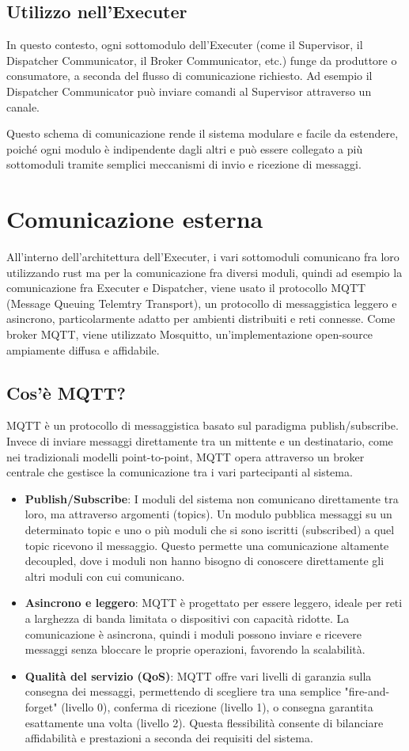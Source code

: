 \documentclass[target=bach,aauheader=,style=]{thud}
\begin{document}
\subsection{Utilizzo nell'Executer}
In questo contesto, ogni sottomodulo dell'Executer (come il Supervisor, il Dispatcher Communicator, il Broker Communicator, etc.) funge da produttore o consumatore, a seconda del flusso di comunicazione richiesto. Ad esempio il Dispatcher Communicator può inviare comandi al Supervisor attraverso un canale.

Questo schema di comunicazione rende il sistema modulare e facile da estendere, poiché ogni modulo è indipendente dagli altri e può essere collegato a più sottomoduli tramite semplici meccanismi di invio e ricezione di messaggi.

\section{Comunicazione esterna}
All'interno dell'architettura dell'Executer, i vari sottomoduli comunicano fra loro utilizzando rust ma per la comunicazione fra diversi moduli, quindi ad esempio la comunicazione fra Executer e Dispatcher, viene usato il protocollo MQTT (Message Queuing Telemtry Transport), un protocollo di messaggistica leggero e asincrono, particolarmente adatto per ambienti distribuiti e reti connesse. Come broker MQTT, viene utilizzato Mosquitto, un'implementazione open-source ampiamente diffusa e affidabile. 
\subsection{Cos'è MQTT?}
MQTT \cite{mqtt2024} è un protocollo di messaggistica basato sul paradigma publish/subscribe. Invece di inviare messaggi direttamente tra un mittente e un destinatario, come nei tradizionali modelli point-to-point, MQTT opera attraverso un broker centrale che gestisce la comunicazione tra i vari partecipanti al sistema.
\begin{itemize}
  \item \textbf{Publish/Subscribe}: I moduli del sistema non comunicano direttamente tra loro, ma attraverso argomenti (topics). Un modulo pubblica messaggi su un determinato topic e uno o più moduli che si sono iscritti (subscribed) a quel topic ricevono il messaggio. Questo permette una comunicazione altamente decoupled, dove i moduli non hanno bisogno di conoscere direttamente gli altri moduli con cui comunicano.
  \item \textbf{Asincrono e leggero}: MQTT è progettato per essere leggero, ideale per reti a larghezza di banda limitata o dispositivi con capacità ridotte. La comunicazione è asincrona, quindi i moduli possono inviare e ricevere messaggi senza bloccare le proprie operazioni, favorendo la scalabilità.
  \item \textbf{Qualità del servizio (QoS)}: MQTT offre vari livelli di garanzia sulla consegna dei messaggi, permettendo di scegliere tra una semplice "fire-and-forget" (livello 0), conferma di ricezione (livello 1), o consegna garantita esattamente una volta (livello 2). Questa flessibilità consente di bilanciare affidabilità e prestazioni a seconda dei requisiti del sistema.
\end{itemize}
\end{document}
